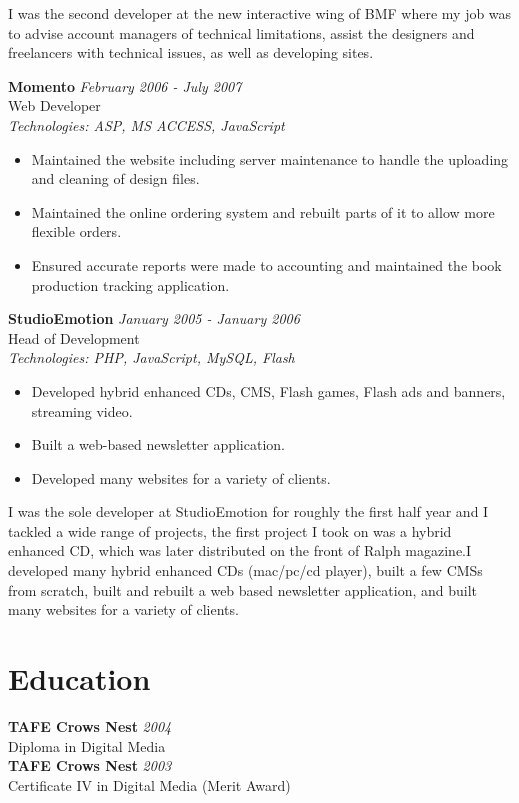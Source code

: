 \documentclass[a4paper,10pt]{article}
\begin{document}
I was the second developer at the new interactive wing of BMF where my job was to advise account managers of technical limitations, assist the designers and freelancers with technical issues, as well as developing sites.

\vspace{1em}

\textbf{Momento} \hfill \textit{February 2006 - July 2007} \\
Web Developer \\
\textit{Technologies: ASP, MS ACCESS, JavaScript}
\begin{itemize}
    \item Maintained the website including server maintenance to handle the uploading and cleaning of design files.
    \item Maintained the online ordering system and rebuilt parts of it to allow more flexible orders.
    \item Ensured accurate reports were made to accounting and maintained the book production tracking application.
\end{itemize}

\vspace{1em}

\textbf{StudioEmotion} \hfill \textit{January 2005 - January 2006} \\
Head of Development \\
\textit{Technologies: PHP, JavaScript, MySQL, Flash}
\begin{itemize}
    \item Developed hybrid enhanced CDs, CMS, Flash games, Flash ads and banners, streaming video.
    \item Built a web-based newsletter application.
    \item Developed many websites for a variety of clients.
\end{itemize}

I was the sole developer at StudioEmotion for roughly the first half year and I tackled a wide range of projects, the first project I took on was a hybrid enhanced CD, which was later distributed on the front of Ralph magazine.I developed many hybrid enhanced CDs (mac/pc/cd player), built a few CMSs from scratch, built and rebuilt a web based newsletter application, and built many websites for a variety of clients.

\section*{Education}

\textbf{TAFE Crows Nest} \hfill \textit{2004} \\
Diploma in Digital Media \\
\textbf{TAFE Crows Nest} \hfill \textit{2003} \\
Certificate IV in Digital Media (Merit Award)
\end{document}
